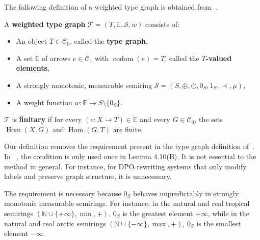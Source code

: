 The following definition of a weighted type graph is obtained from~\cite[Def. 3.1]{endrullis2024generalized}.
\begin{definition}
    \label{def:weighted_type_graph}
    A \textbf{weighted type graph} \(\mathcal{T} = (T, \mathbb{E}, \mathcal{S}, w)\) consists of:
    \begin{itemize}
        \item An object \(T \in \mathcal{C}_0\), called the \textbf{type graph},
        \item A set \(\mathbb{E}\) of arrows \(e \in \mathcal{C}_1\) with \(\operatorname{codom}(e) = T\), called the \textbf{\(T\)-valued elements}, 
        \item A strongly monotonic, measurable semiring \(\mathcal{S}=(S, \oplus, \odot, 0_S, 1_S, \prec, \mu)\),
        \item A weight function \(w : \mathbb{E} \to S \setminus \{0_S\}\).
    \end{itemize}
    \(\mathcal{T}\) is \textbf{finitary} if for every \((e:X \to T) \in \mathbb{E}\) and every \(G \in \mathcal{C}_0\), the sets \(\operatorname{Hom}(X, G)\) and \(\operatorname{Hom}(G, T)\) are finite.
\end{definition}
\begin{remark}
    \label{remark:greater_than_1}
    Our definition removes the requirement  present in the type graph definition of~\cite{endrullis2024generalized}. In ~\cite{endrullis2024generalized}, the condition is only used 
    once in Lemma 4.10(B).
    It is not essential to the method in general. For instance, for DPO rewriting systems that only modify labels and preserve graph structure, it is unnecessary.
\end{remark} 
\begin{remark}
    \label{remark:semiring_0_unpredictable}
    The requirement  is necessary because \(0_S\) behaves unpredictably in strongly monotonic measurable semirings. For instance, in the natural and real tropical semirings \((\mathbb{N} \cup \{+\infty\}, \min, +)\), \(0_S\) is the greatest element \(+\infty\), while in the natural and real arctic semirings \((\mathbb{N} \cup \{-\infty\}, \max, +)\), \(0_S\) is the smallest element \(-\infty\).
\end{remark}
